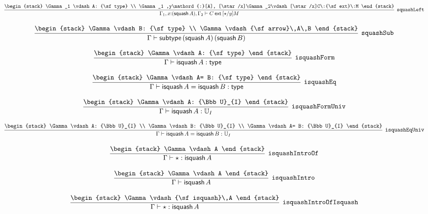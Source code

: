 \[
\infer[{\tt squashLeft}]{\Gamma_1 ,x\mathord{:}({\sf squash}\,A), \Gamma_2 \vdash C\:{\sf ext}\:[\star /y]M}{
\begin{stack}
\Gamma_1 \vdash A: {\sf type}
\\
\Gamma_1 ,y\mathord{:}[A], [\star /x]\Gamma_2\vdash [\star /x]C\:{\sf ext}\:M
\end{stack}}
\]

\[
\infer[{\tt squashSub}]{\Gamma \vdash {\sf subtype}\,({\sf squash}\,A)\,({\sf squash}\,B)}{
\begin{stack}
\Gamma \vdash B: {\sf type}
\\
\Gamma \vdash {\sf arrow}\,A\,B
\end{stack}}
\]

\[
\infer[{\tt isquashForm}]{\Gamma \vdash {\sf isquash}\,A: {\sf type}}{
\begin{stack}
\Gamma \vdash A: {\sf type}
\end{stack}}
\]

\[
\infer[{\tt isquashEq}]{\Gamma \vdash {\sf isquash}\,A= {\sf isquash}\,B: {\sf type}}{
\begin{stack}
\Gamma \vdash A= B: {\sf type}
\end{stack}}
\]

\[
\infer[{\tt isquashFormUniv}]{\Gamma \vdash {\sf isquash}\,A: {\Bbb U}_{I}}{
\begin{stack}
\Gamma \vdash A: {\Bbb U}_{I}
\end{stack}}
\]

\[
\infer[{\tt isquashEqUniv}]{\Gamma \vdash {\sf isquash}\,A= {\sf isquash}\,B: {\Bbb U}_{I}}{
\begin{stack}
\Gamma \vdash A: {\Bbb U}_{I}
\\
\Gamma \vdash B: {\Bbb U}_{I}
\\
\Gamma \vdash A= B: {\Bbb U}_{I}
\end{stack}}
\]

\[
\infer[{\tt isquashIntroOf}]{\Gamma \vdash \star : {\sf isquash}\,A}{
\begin{stack}
\Gamma \vdash A
\end{stack}}
\]

\[
\infer[{\tt isquashIntro}]{\Gamma \vdash {\sf isquash}\,A}{
\begin{stack}
\Gamma \vdash A
\end{stack}}
\]

\[
\infer[{\tt isquashIntroOfIsquash}]{\Gamma \vdash \star : {\sf isquash}\,A}{
\begin{stack}
\Gamma \vdash {\sf isquash}\,A
\end{stack}}
\]


